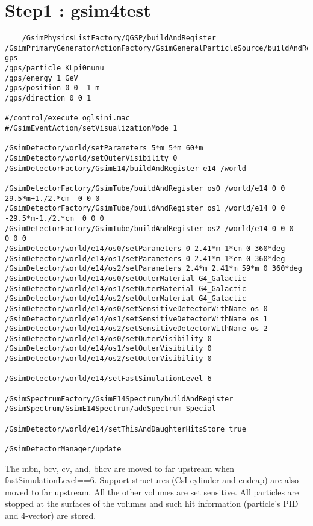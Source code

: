 \documentclass[a4paper,12pt]{article}
\begin{document}
  \section{Step1 : gsim4test}
  \begin{verbatim}
	/GsimPhysicsListFactory/QGSP/buildAndRegister
/GsimPrimaryGeneratorActionFactory/GsimGeneralParticleSource/buildAndRegister gps
/gps/particle KLpi0nunu
/gps/energy 1 GeV
/gps/position 0 0 -1 m
/gps/direction 0 0 1

#/control/execute oglsini.mac
#/GsimEventAction/setVisualizationMode 1

/GsimDetector/world/setParameters 5*m 5*m 60*m
/GsimDetector/world/setOuterVisibility 0
/GsimDetectorFactory/GsimE14/buildAndRegister e14 /world

/GsimDetectorFactory/GsimTube/buildAndRegister os0 /world/e14 0 0  29.5*m+1./2.*cm  0 0 0
/GsimDetectorFactory/GsimTube/buildAndRegister os1 /world/e14 0 0 -29.5*m-1./2.*cm  0 0 0
/GsimDetectorFactory/GsimTube/buildAndRegister os2 /world/e14 0 0 0                 0 0 0
/GsimDetector/world/e14/os0/setParameters 0 2.41*m 1*cm 0 360*deg
/GsimDetector/world/e14/os1/setParameters 0 2.41*m 1*cm 0 360*deg
/GsimDetector/world/e14/os2/setParameters 2.4*m 2.41*m 59*m 0 360*deg
/GsimDetector/world/e14/os0/setOuterMaterial G4_Galactic
/GsimDetector/world/e14/os1/setOuterMaterial G4_Galactic
/GsimDetector/world/e14/os2/setOuterMaterial G4_Galactic
/GsimDetector/world/e14/os0/setSensitiveDetectorWithName os 0
/GsimDetector/world/e14/os1/setSensitiveDetectorWithName os 1
/GsimDetector/world/e14/os2/setSensitiveDetectorWithName os 2
/GsimDetector/world/e14/os0/setOuterVisibility 0
/GsimDetector/world/e14/os1/setOuterVisibility 0
/GsimDetector/world/e14/os2/setOuterVisibility 0

/GsimDetector/world/e14/setFastSimulationLevel 6

/GsimSpectrumFactory/GsimE14Spectrum/buildAndRegister
/GsimSpectrum/GsimE14Spectrum/addSpectrum Special

/GsimDetector/world/e14/setThisAndDaughterHitsStore true

/GsimDetectorManager/update

  \end{verbatim}
  The mbn, bcv, cv, and, bhcv are moved to far upstream when
  fastSimulationLevel==6. Support structures (CsI cylinder and endcap)
  are also moved to far upstream. All the other volumes are set
  sensitive. All particles are stopped at the surfaces of the volumes
  and such hit information (particle's PID and 4-vector) are stored.
\end{document}
